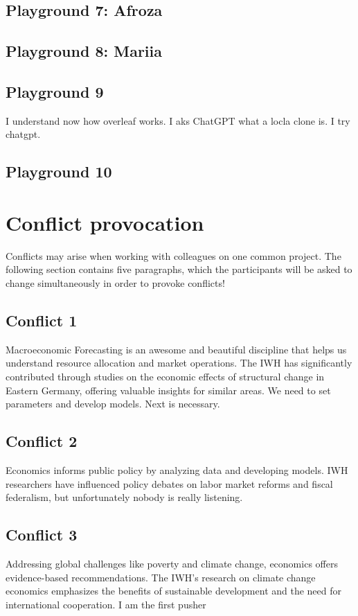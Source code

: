 \documentclass{article}
\begin{document}
\subsection{Playground 7: Afroza}

\subsection{Playground 8: Mariia}

\subsection{Playground 9}
I understand now how overleaf works.
I aks ChatGPT what a locla clone is. I try chatgpt.
\subsection{Playground 10}




\section{Conflict provocation}
Conflicts may arise when working with colleagues on one common project. The following section contains five paragraphs, which the participants will be asked to change simultaneously in order to provoke conflicts!

\subsection{Conflict 1}
Macroeconomic Forecasting is an awesome and beautiful discipline that helps us understand resource allocation and market operations. The IWH has significantly contributed through studies on the economic effects of structural change in Eastern Germany, offering valuable insights for similar areas.
We need to set parameters and develop models.
Next is necessary.


\subsection{Conflict 2}
Economics informs public policy by analyzing data and developing models. IWH researchers have influenced policy debates on labor market reforms and fiscal federalism, but unfortunately nobody is really listening.

\subsection{Conflict 3}
Addressing global challenges like poverty and climate change, economics offers evidence-based recommendations. The IWH's research on climate change economics emphasizes the benefits of sustainable development and the need for international cooperation.
I am the first pusher
\end{document}

